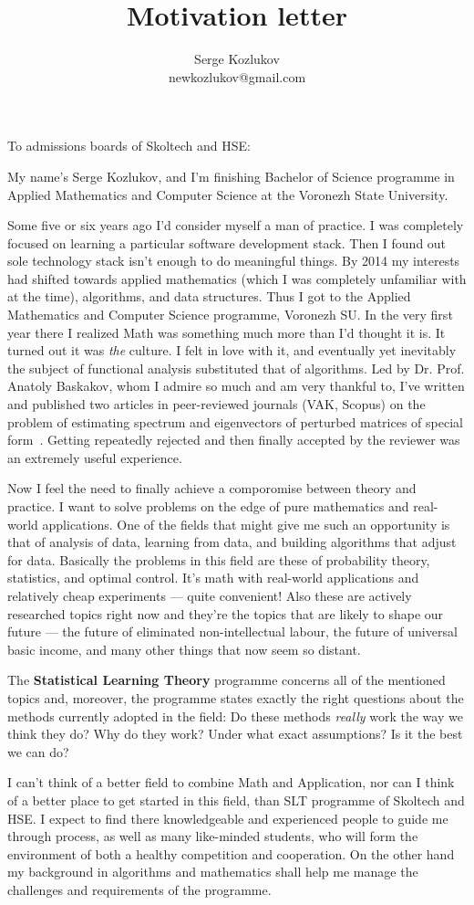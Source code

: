 \documentclass{article}
\title{Motivation letter}
\author{Serge Kozlukov\\
newkozlukov@gmail.com}
\begin{document}
\maketitle

To admissions boards of Skoltech and HSE:

My name's Serge Kozlukov, and I'm finishing Bachelor of Science programme in
Applied Mathematics and Computer Science at the Voronezh State University.

Some five or six years ago I'd consider myself a man of practice. I was
completely focused on learning a particular software development stack.
Then I found out sole technology stack isn't enough to do meaningful things.
By 2014 my interests had shifted towards applied mathematics (which I was
completely unfamiliar with at the time), algorithms, and data structures.
Thus I got to the Applied Mathematics and Computer Science programme, Voronezh
SU. In the very first year there I realized Math was something much more than
I'd thought it is. It turned out it was \emph{the} culture. I felt in love with
it, and eventually yet inevitably the subject of functional analysis substituted
that of algorithms. Led by Dr. Prof. Anatoly Baskakov, whom I admire so much and
am very thankful to,
I've written and published two articles in peer-reviewed journals (VAK, Scopus)
on the problem of estimating spectrum and eigenvectors of perturbed matrices of
special form~\cite{Koz17,Koz18}.
Getting repeatedly rejected and then finally accepted by the reviewer was an
extremely useful experience.

Now I feel the need to finally achieve a comporomise between theory and
practice. I want to solve problems on the edge of pure mathematics and
real-world applications. One of the fields that might give me such an opportunity
is that of analysis of data, learning from data, and building algorithms that
adjust for data. Basically the problems in this field are these of
probability theory, statistics, and optimal control. It's math with real-world
applications and relatively cheap experiments --- quite convenient!
Also these are actively researched topics right now and they're the
topics that are likely to shape our future --- the future of eliminated
non-intellectual labour, the future of universal basic income, and many other
things that now seem so distant.

The \textbf{Statistical Learning Theory} programme concerns all of the mentioned
topics and, moreover, the programme states exactly the right questions about the
methods currently adopted in the field: Do these methods \emph{really} work the
way we think they do? Why do they work? Under what exact assumptions? Is it the
best we can do?

I can't think of a better field to combine Math and Application,
nor can I think of a better place to get started in this field, than SLT
programme of Skoltech and HSE. I expect to find there knowledgeable and
experienced people to guide me through process, as well as many like-minded
students, who will form the environment of both a healthy competition and
cooperation. On the other hand my background in algorithms and mathematics shall
help me manage the challenges and requirements of the programme.

\printbibliography
\end{document}
